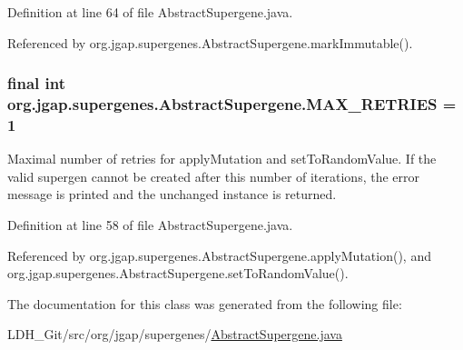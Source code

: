Definition at line 64 of file Abstract\-Supergene.\-java.



Referenced by org.\-jgap.\-supergenes.\-Abstract\-Supergene.\-mark\-Immutable().

\hypertarget{classorg_1_1jgap_1_1supergenes_1_1_abstract_supergene_a6839c4b04a89a58c967219eda28a5dbb}{
\subsubsection[{M\-A\-X\-\_\-\-R\-E\-T\-R\-I\-E\-S}]{\setlength{\rightskip}{0pt plus 5cm}final int org.\-jgap.\-supergenes.\-Abstract\-Supergene.\-M\-A\-X\-\_\-\-R\-E\-T\-R\-I\-E\-S = 1\hspace{0.3cm}{\ttfamily [static]}}}\label{classorg_1_1jgap_1_1supergenes_1_1_abstract_supergene_a6839c4b04a89a58c967219eda28a5dbb}
Maximal number of retries for apply\-Mutation and set\-To\-Random\-Value. If the valid supergen cannot be created after this number of iterations, the error message is printed and the unchanged instance is returned. 

Definition at line 58 of file Abstract\-Supergene.\-java.



Referenced by org.\-jgap.\-supergenes.\-Abstract\-Supergene.\-apply\-Mutation(), and org.\-jgap.\-supergenes.\-Abstract\-Supergene.\-set\-To\-Random\-Value().



The documentation for this class was generated from the following file\-:\begin{DoxyCompactItemize}
\item 
L\-D\-H\-\_\-\-Git/src/org/jgap/supergenes/\hyperlink{_abstract_supergene_8java}{Abstract\-Supergene.\-java}\end{DoxyCompactItemize}
